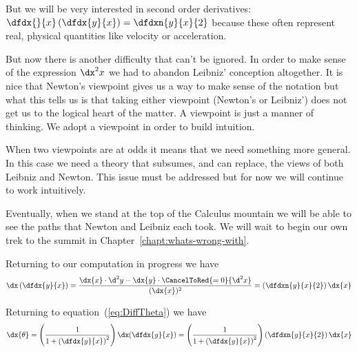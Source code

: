 \begin{Digression}
  But we will be very interested in second order derivatives:
  $ \dfdx{}{x}\left(\dfdx{y}{x}\right) = \dfdxn{y}{x}{2} $ because
  these often represent real, physical quantities like velocity or
  acceleration.
  
  But now there is another difficulty that can't be ignored.  In order
  to make sense of the expression $\dx^2{x}$ we had to abandon
  Leibniz' conception altogether. It is nice that Newton's viewpoint
  gives us a way to make sense of the notation but what this tells us
  is that taking either viewpoint (Newton's or Leibniz') does not get
  us to the logical heart of the matter. A viewpoint is just a manner
  of thinking. We adopt a viewpoint in order to build intuition.

  When two viewpoints are at odds it means that we need something more
  general. In this case we need a theory that subsumes, and can
  replace, the views of both Leibniz and Newton.
  This issue must be addressed but for now we will continue to work
  intuitively.

  Eventually, when we stand at the top of the Calculus mountain we
  will be able to see the paths that Newton and Leibniz each took.  We
  will wait to begin our own trek to the summit in
  Chapter~\ref{chapt:whats-wrong-with}.
\end{Digression}

Returning to our computation in progress we have
$$
\dx\left(\dfdx{y}{x}\right) =\frac{\dx{x}\cdot
  \d^2{y}-\dx{y}\cdot\CancelToRed{=0}{\d^2{x}}}{(\dx{x})^2} =
\left(\dfdxn{y}{x}{2}\right)\dx{x}%
$$

Returning to equation~(\ref{eq:DiffTheta}) we have
$$
\dx{\theta}=\left(\frac{1}{1+\left(\dfdx{y}{x}\right)^2}\right)\dx\hskip-2pt\left(\dfdx{y}{x}\right)=\left(\frac{1}{1+\left(\dfdx{y}{x}\right)^2}\right)\left(\dfdxn{y}{x}{2}\right)\dx{x}
$$
